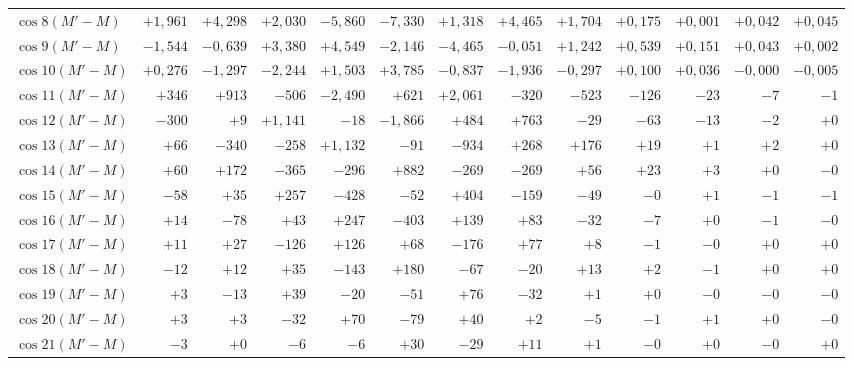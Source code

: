 \begin{landscape}
\begin{longtable}{@{}l|r|r|r|r|r|r|r|r|r|r|r|r@{}}
\(\cos 8(M'-M)\) & \(+1{,}961\) & \(+4{,}298\) & \(+2{,}030\) & \(-5{,}860\) & \(-7{,}330\) & \(+1{,}318\) & \(+4{,}465\) & \(+1{,}704\) & \(+0{,}175\) & \(+0{,}001\) & \(+0{,}042\) & \(+0{,}045\)\\
\(\cos 9(M'-M)\) & \(-1{,}544\) & \(-0{,}639\) & \(+3{,}380\) & \(+4{,}549\) & \(-2{,}146\) & \(-4{,}465\) & \(-0{,}051\) & \(+1{,}242\) & \(+0{,}539\) & \(+0{,}151\) & \(+0{,}043\) & \(+0{,}002\)\\
\(\cos 10(M'-M)\) & \(+0{,}276\) & \(-1{,}297\) & \(-2{,}244\) & \(+1{,}503\) & \(+3{,}785\) & \(-0{,}837\) & \(-1{,}936\) & \(-0{,}297\) & \(+0{,}100\) & \(+0{,}036\) & \(-0{,}000\) & \(-0{,}005\)\\
\(\cos 11(M'-M)\) & \(+346\) & \(+913\) & \(-506\) & \(-2{,}490\) & \(+621\) & \(+2{,}061\) & \(-320\) & \(-523\) & \(-126\) & \(-23\) & \(-7\) & \(-1\)\\
\(\cos 12(M'-M)\) & \(-300\) & \(+9\) & \(+1{,}141\) & \(-18\) & \(-1{,}866\) & \(+484\) & \(+763\) & \(-29\) & \(-63\) & \(-13\) & \(-2\) & \(+0\)\\
\(\cos 13(M'-M)\) & \(+66\) & \(-340\) & \(-258\) & \(+1{,}132\) & \(-91\) & \(-934\) & \(+268\) & \(+176\) & \(+19\) & \(+1\) & \(+2\) & \(+0\)\\
\(\cos 14(M'-M)\) & \(+60\) & \(+172\) & \(-365\) & \(-296\) & \(+882\) & \(-269\) & \(-269\) & \(+56\) & \(+23\) & \(+3\) & \(+0\) & \(-0\)\\
\(\cos 15(M'-M)\) & \(-58\) & \(+35\) & \(+257\) & \(-428\) & \(-52\) & \(+404\) & \(-159\) & \(-49\) & \(-0\) & \(+1\) & \(-1\) & \(-1\)\\
\(\cos 16(M'-M)\) & \(+14\) & \(-78\) & \(+43\) & \(+247\) & \(-403\) & \(+139\) & \(+83\) & \(-32\) & \(-7\) & \(+0\) & \(-1\) & \(-0\)\\
\(\cos 17(M'-M)\) & \(+11\) & \(+27\) & \(-126\) & \(+126\) & \(+68\) & \(-176\) & \(+77\) & \(+8\) & \(-1\) & \(-0\) & \(+0\) & \(+0\)\\
\(\cos 18(M'-M)\) & \(-12\) & \(+12\) & \(+35\) & \(-143\) & \(+180\) & \(-67\) & \(-20\) & \(+13\) & \(+2\) & \(-1\) & \(+0\) & \(+0\)\\
\(\cos 19(M'-M)\) & \(+3\) & \(-13\) & \(+39\) & \(-20\) & \(-51\) & \(+76\) & \(-32\) & \(+1\) & \(+0\) & \(-0\) & \(-0\) & \(-0\)\\
\(\cos 20(M'-M)\) & \(+3\) & \(+3\) & \(-32\) & \(+70\) & \(-79\) & \(+40\) & \(+2\) & \(-5\) & \(-1\) & \(+1\) & \(+0\) & \(-0\)\\
\(\cos 21(M'-M)\) & \(-3\) & \(+0\) & \(-6\) & \(-6\) & \(+30\) & \(-29\) & \(+11\) & \(+1\) & \(-0\) & \(+0\) & \(-0\) & \(+0\)\\

\end{longtable}
\end{landscape}
